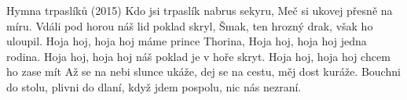 \begin{TEXT}{Hymna trpaslíků (2015)} %
\SLOKA Kdo jsi trpaslík nabrus sekyru,
Meč si ukovej přesně na míru.
Vdáli pod horou náš lid poklad skryl,
Šmak, ten hrozný drak, však ho uloupil.
\REFREN Hoja hoj, hoja hoj máme prince Thorina,
Hoja hoj, hoja hoj jedna rodina.
Hoja hoj, hoja hoj náš poklad je v hoře skryt.
Hoja hoj, hoja hoj chcem ho zase mít
\SLOKA Až se na nebi slunce ukáže,
dej se na cestu, měj dost kuráže.
Bouchni do stolu, plivni do dlaní,
když jdem pospolu, nic nás nezraní.
\REFRENHRAJ
\end{TEXT}